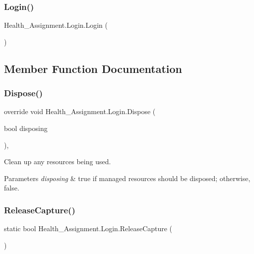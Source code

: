 \subsubsection{\texorpdfstring{Login()}{Login()}}
{\footnotesize\ttfamily Health\+\_\+\+Assignment.\+Login.\+Login (\begin{DoxyParamCaption}{ }\end{DoxyParamCaption})\hspace{0.3cm}{\ttfamily [inline]}}



\subsection{Member Function Documentation}
\mbox{\label{class_health___assignment_1_1_login_a387f5a2afea3056180cbce02bff06a48}} 
\subsubsection{\texorpdfstring{Dispose()}{Dispose()}}
{\footnotesize\ttfamily override void Health\+\_\+\+Assignment.\+Login.\+Dispose (\begin{DoxyParamCaption}\item[{bool}]{disposing }\end{DoxyParamCaption})\hspace{0.3cm}{\ttfamily [inline]}, {\ttfamily [protected]}}



Clean up any resources being used. 


\begin{DoxyParams}{Parameters}
{\em disposing} & true if managed resources should be disposed; otherwise, false.\\
\hline
\end{DoxyParams}
\mbox{\label{class_health___assignment_1_1_login_adf210b2b8bea355dfa53988a6679cc71}} 
\subsubsection{\texorpdfstring{Release\+Capture()}{ReleaseCapture()}}
{\footnotesize\ttfamily static bool Health\+\_\+\+Assignment.\+Login.\+Release\+Capture (\begin{DoxyParamCaption}{ }\end{DoxyParamCaption})}


